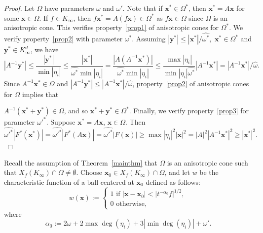 \documentclass[10pt]{amsart}
\theoremstyle{plain}
\theoremstyle{plain}
\renewcommand{\vec}[1]{\mathbf{#1}}
\theoremstyle{remark}
\theoremstyle{definition}
\renewcommand{\hat}{\widehat}
\newcommand{\Ki}{K_\infty}
\begin{document}
\begin{proof}
Let $\Omega$ have parameters $\omega$ and $\omega'$. Note that if $\vec{x}^*\in\Omega^*$, then $\vec{x}^*=A\vec{x}$ for some $\vec{x}\in\Omega$. If $f\in\Ki$, then $f\vec{x}^*=A(f\vec{x})\in\Omega^*$ as $f\vec{x}\in\Omega$ since $\Omega$ is an anisotropic cone. This verifies property~\eqref{prop1} of anisotropic cones for $\Omega^*.$ 
We verify property~\eqref{prop2} with parameter $\omega^*$. Assuming  
\(|\vec{y}^*|\leq |\vec{x}^*|/\hat{\omega^*},\)  $\vec{x}^*\in\Omega^*$ and $\vec{y}^*\in\Ki^d$, we have 
\[
|A^{-1}\vec{y}^*|\leq \frac{|\vec{y}^*|}{\min|\eta_i|}\leq\frac{|\vec{x}^*|}{\hat{\omega^*}\min|\eta_i|}=\frac{|A(A^{-1}\vec{x}^*)|}{\hat{\omega^*}\min|\eta_i|}\leq\frac{\max|\eta_i|}{\min|\eta_i|\hat{\omega^*}}|A^{-1}\vec{x}^*|= |A^{-1}\vec{x}^*|/\hat{\omega}.
\]
Since $A^{-1}\vec{x}^*\in\Omega$ and $|A^{-1}\vec{y}^*|\leq |A^{-1}\vec{x}^*|/\hat{\omega}$, property~\eqref{prop2} of anisotropic cones for $\Omega$ implies that 

 $A^{-1}(\vec{x}^*+\vec{y}^*)\in\Omega$, and so $\vec{x}^*+\vec{y}^*\in\Omega^*$. Finally, we verify property~\eqref{prop3} for parameter $\omega'^*.$ Suppose $\vec{x}^*=A\vec{x}$, $\vec{x}\in\Omega$. Then 
\[\hat{\omega'^*}|F^*(\vec{x}^*)|=\hat{\omega'^*}|F^*(A\vec{x})|=\hat{\omega'^*}|F(\vec{x})|\geq \max|\eta_i|^2|\vec{x}|^2= |A|^2|A^{-1}\vec{x}^*|^2\geq |\vec{x}^*|^2.\]
\end{proof}
Recall the assumption of Theorem~\ref{mainthm} that $\Omega$ is an anisotropic cone such that $X_{f}(\Ki)\cap\Omega\neq\emptyset$. Choose $\vec{x}_0\in X_{f}(\Ki)\cap\Omega$, and let $w$ be the characteristic function of a ball centered at $\vec{x}_0$ defined as follows:
\begin{equation}\label{defw}
w(\vec{x}):=\begin{cases}
1 \text{ if } |\vec{x}-\vec{x}_0| < |t^{-\alpha_0}f|^{1/2},
\\
0 \text{ otherwise,}
\end{cases}
\end{equation}
where 
\begin{equation}\label{alpha0}
\alpha_0:=2\omega+2\max{\deg(\eta_i)}+3|\min\deg(\eta_i)|+\omega'.
\end{equation}
\end{document}

